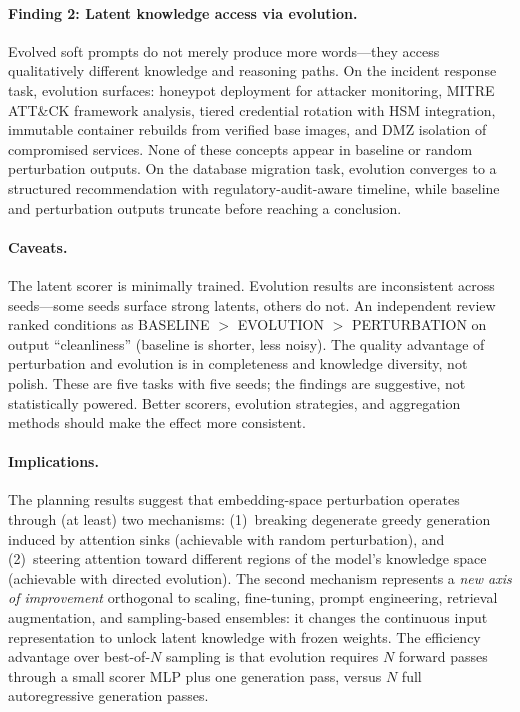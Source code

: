 \documentclass{article}
\begin{document}
\paragraph{Finding 2: Latent knowledge access via evolution.}
Evolved soft prompts do not merely produce more words---they access
qualitatively different knowledge and reasoning paths. On the incident
response task, evolution surfaces: honeypot deployment for attacker
monitoring, MITRE ATT\&CK framework analysis, tiered credential rotation
with HSM integration, immutable container rebuilds from verified base
images, and DMZ isolation of compromised services. None of these concepts
appear in baseline or random perturbation outputs. On the database
migration task, evolution converges to a structured recommendation with
regulatory-audit-aware timeline, while baseline and perturbation outputs
truncate before reaching a conclusion.

\paragraph{Caveats.}
The latent scorer is minimally trained. Evolution results are inconsistent
across seeds---some seeds surface strong latents, others do not. An
independent review ranked conditions as BASELINE $>$ EVOLUTION $>$
PERTURBATION on output ``cleanliness'' (baseline is shorter, less noisy).
The quality advantage of perturbation and evolution is in completeness
and knowledge diversity, not polish. These are five tasks with five seeds;
the findings are suggestive, not statistically powered. Better scorers,
evolution strategies, and aggregation methods should make the effect more
consistent.

\paragraph{Implications.}
The planning results suggest that embedding-space perturbation operates
through (at least) two mechanisms: (1)~breaking degenerate greedy
generation induced by attention sinks (achievable with random perturbation),
and (2)~steering attention toward different regions of the model's knowledge
space (achievable with directed evolution). The second mechanism represents
a \emph{new axis of improvement} orthogonal to scaling, fine-tuning, prompt
engineering, retrieval augmentation, and sampling-based ensembles: it changes
the continuous input representation to unlock latent knowledge with frozen
weights. The efficiency advantage over best-of-$N$ sampling is that
evolution requires $N$ forward passes through a small scorer MLP plus one
generation pass, versus $N$ full autoregressive generation passes.
\end{document}
